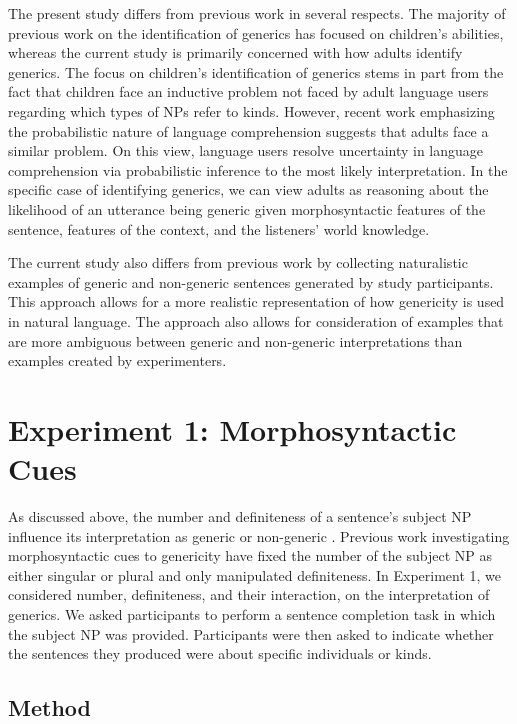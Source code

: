 \documentclass[10pt,letterpaper]{article}
\begin{document}
The present study differs from previous work in several respects. The majority of previous work on the identification of generics has focused on children's abilities, whereas the current study is primarily concerned with how adults identify generics. The focus on children's identification of generics stems in part from the fact that children face an inductive problem not faced by adult language users regarding which types of NPs refer to kinds. However, recent work emphasizing the probabilistic nature of language comprehension \cite{Frank:2012,Levy:2008} suggests that adults face a similar problem. On this view, language users resolve uncertainty in language comprehension via probabilistic inference to the most likely interpretation. In the specific case of identifying generics, we can view adults as reasoning about the likelihood of an utterance being generic given morphosyntactic features of the sentence, features of the context, and the listeners' world knowledge. 

The current study also differs from previous work by collecting naturalistic examples of generic and non-generic sentences generated by study participants. This approach allows for a more realistic representation of how genericity is used in natural language. The approach also allows for consideration of examples that are more ambiguous between generic and non-generic interpretations than examples created by experimenters. 

\section{Experiment 1: Morphosyntactic Cues}

As discussed above, the number and definiteness of a sentence's subject NP influence its interpretation as generic or non-generic \cite{Carlson:1977,Krifka:1995,Lyons:1977}. Previous work investigating morphosyntactic cues to genericity have fixed the number of the subject NP as either singular \cite{Cimpian:2011} or plural \cite{Gelman:2003} and only manipulated definiteness. In Experiment 1, we considered number, definiteness, and their interaction, on the interpretation of generics. We asked participants to perform a sentence completion task in which the subject NP was provided. Participants were then asked to indicate whether the sentences they produced were about specific individuals or kinds.

\subsection{Method}
\end{document}
